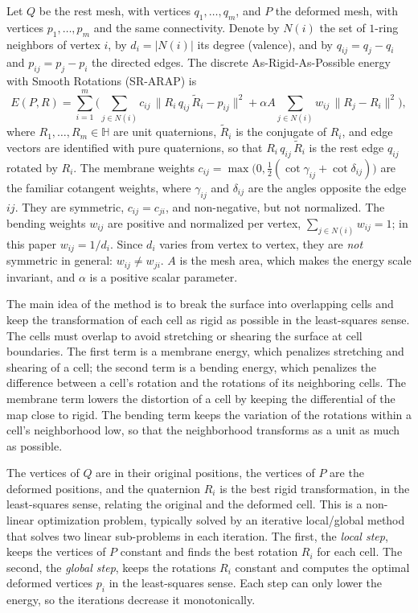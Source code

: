 \documentclass{birkjour}
\theoremstyle{remark}
\numberwithin{equation}{section}
\begin{document}
Let $Q$ be the rest mesh, with vertices $q_1, \dots, q_m$, and $P$ the deformed mesh, with vertices $p_1, \dots, p_m$ and the same connectivity. Denote by $N(i)$ the set of $1$-ring neighbors of vertex $i$, by $d_i = |N(i)|$ its degree (valence), and by $q_{ij} = q_j - q_i$ and $p_{ij} = p_j - p_i$ the directed edges. The discrete As-Rigid-As-Possible energy with Smooth Rotations (SR-ARAP) is
\begin{equation}
\label{eq:sr_arap}
E(P, R) = \sum_{i=1}^m \Big( \sum_{j \in N(i)} c_{ij} \, \| R_i \, q_{ij} \, \tilde R_i - p_{ij} \|^2
+ \alpha A \sum_{j \in N(i)} w_{ij} \, \| R_j - R_i \|^2 \Big),
\end{equation}
where $R_1, \dots, R_m \in \mathbb{H}$ are unit quaternions, $\tilde R_i$ is the conjugate of $R_i$, and edge vectors are identified with pure quaternions, so that $R_i \, q_{ij} \, \tilde R_i$ is the rest edge $q_{ij}$ rotated by $R_i$.
The membrane weights $c_{ij} = \max\big(0, \tfrac{1}{2}(\cot \gamma_{ij} + \cot \delta_{ij})\big)$ are the familiar cotangent weights, where $\gamma_{ij}$ and $\delta_{ij}$ are the angles opposite the edge $ij$. They are symmetric, $c_{ij} = c_{ji}$, and non-negative, but not normalized.
The bending weights $w_{ij}$ are positive and normalized per vertex, $\sum_{j \in N(i)} w_{ij} = 1$; in this paper $w_{ij} = 1/d_i$. Since $d_i$ varies from vertex to vertex, they are \emph{not} symmetric in general: $w_{ij} \neq w_{ji}$.
$A$ is the mesh area, which makes the energy scale invariant, and $\alpha$ is a positive scalar parameter.

The main idea of the method is to break the surface into overlapping cells and keep the transformation of each cell as rigid as possible in the least-squares sense. The cells must overlap to avoid stretching or shearing the surface at cell boundaries.
The first term is a membrane energy, which penalizes stretching and shearing of a cell; the second term is a bending energy, which penalizes the difference between a cell's rotation and the rotations of its neighboring cells.
The membrane term lowers the distortion of a cell by keeping the differential of the map close to rigid.
The bending term keeps the variation of the rotations within a cell's neighborhood low, so that the neighborhood transforms as a unit as much as possible.

The vertices of $Q$ are in their original positions, the vertices of $P$ are the deformed positions, and the quaternion $R_i$ is the best rigid transformation, in the least-squares sense, relating the original and the deformed cell.
This is a non-linear optimization problem, typically solved by an iterative local/global method that solves two linear sub-problems in each iteration.
The first, the \emph{local step}, keeps the vertices of $P$ constant and finds the best rotation $R_i$ for each cell. The second, the \emph{global step}, keeps the rotations $R_i$ constant and computes the optimal deformed vertices $p_i$ in the least-squares sense. Each step can only lower the energy, so the iterations decrease it monotonically.
\end{document}
